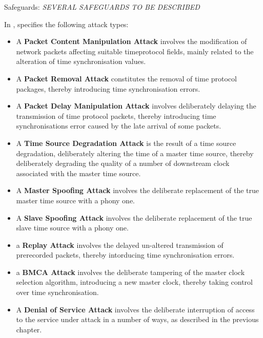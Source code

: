Safeguards: \textit{SEVERAL SAFEGUARDS TO BE DESCRIBED}




In \cite{alghamdi2021precision}, \citeauthor{alghamdi2021precision} specifies the following attack types:

\begin{itemize}

\item A \textbf{Packet Content Manipulation Attack} involves the modification of network packets affecting suitable timeprotocol fields, mainly related to the alteration of time synchronisation values. 
\item A \textbf{Packet Removal Attack} constitutes the removal of time protocol packages, thereby introducing time synchronisation errors.
\item A \textbf{Packet Delay Manipulation Attack} involves deliberately delaying the transmission of time protocol packets, thereby introducing time synchronisations error caused by the late arrival of some packets.
\item A \textbf{Time Source Degradation Attack} is the result of a time source degradation, deliberately altering the time of a master time source, thereby deliberately degrading the quality of a number of downstream clock associated with the master time source. 
\item A \textbf{Master Spoofing Attack} involves the deliberate replacement of the true master time source with a phony one.   
\item A \textbf{Slave Spoofing Attack} involves the deliberate replacement of the true slave time source with a phony one. 
\item a \textbf{Replay Attack} involves the delayed un-altered transmission of prerecorded packets, thereby intorducing time synchronisation errors.
\item a \textbf{BMCA Attack} involves the deliberate tampering of the master clock selection algorithm, introducing a new master clock, thereby taking control over time synchronisation.
\item A \textbf{Denial of Service Attack} involves the deliberate interruption of access to the service under attack in a number of ways, as described in the previous chapter.
\end{itemize}





